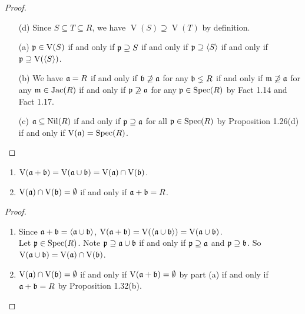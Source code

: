 \begin{proof}
    \begin{enumerate} 
        \item [(d)] Since $S \subseteq T \subseteq R$, we have $\operatorname{V}(S) \supseteq \operatorname{V}(T)$ by definition.
        \item [(a)] $\mathfrak{p} \in \operatorname{V}(S)$ if and only if $\mathfrak{p} \supseteq S$ if and only if $\mathfrak{p} \supseteq \langle S \rangle$ if and only if $\mathfrak{p} \supseteq \operatorname{V}(\langle S \rangle)$.
        \item [(b)]
            We have $\mathfrak{a} = R$ if and only if $\mathfrak{b} \not \supseteq \mathfrak{a}$ for any $\mathfrak{b} \lneq R$ if and only if $\mathfrak{m} \not \supseteq \mathfrak{a}$ for any $\mathfrak{m} \in \operatorname{Jac}(R)$ if and only if $\mathfrak{p} \not \supseteq \mathfrak{a}$ for any $\mathfrak{p} \in \operatorname{Spec}(R)$ by Fact 1.14 and Fact 1.17. 
        \item[(c)] $\mathfrak{a} \subseteq \operatorname{Nil}(R)$ if and only if $\mathfrak{p} \supseteq \mathfrak{a}$ for all $\mathfrak{p} \in \operatorname{Spec}(R)$ by Proposition 1.26(d) if and only if $\operatorname{V}(\mathfrak{a}) = \operatorname{Spec}(R)$. \qedhere
    \end{enumerate}
\end{proof}

\begin{proposition}
    \begin{enumerate}
        \item $\operatorname{V}(\mathfrak{a} + \mathfrak{b}) = \operatorname{V}(\mathfrak{a} \cup \mathfrak{b}) = \operatorname{V}(\mathfrak{a}) \cap \operatorname{V}(\mathfrak{b})$.
        \item $\operatorname{V}(\mathfrak{a}) \cap \operatorname{V}(\mathfrak{b}) = \emptyset$ if and only if $\mathfrak{a} + \mathfrak{b} = R$.
    \end{enumerate}
\end{proposition}

\begin{proof}
    \begin{enumerate}
        \item 
            Since $\mathfrak{a} + \mathfrak{b} = \langle \mathfrak{a} \cup \mathfrak{b} \rangle$, $\operatorname{V}(\mathfrak{a} + \mathfrak{b}) = \operatorname{V}(\langle \mathfrak{a} \cup \mathfrak{b} \rangle) = \operatorname{V}(\mathfrak{a} \cup \mathfrak{b})$. \\
            Let $\mathfrak{p} \in \operatorname{Spec}(R)$. Note $\mathfrak{p} \supseteq \mathfrak{a} \cup \mathfrak{b}$ if and only if $\mathfrak{p} \supseteq \mathfrak{a}$ and $\mathfrak{p} \supseteq \mathfrak{b}$. So $\operatorname{V}(\mathfrak{a} \cup \mathfrak{b}) = \operatorname{V}(\mathfrak{a}) \cap \operatorname{V}(\mathfrak{b})$.
        \item 
            $\operatorname{V}(\mathfrak{a}) \cap \operatorname{V}(\mathfrak{b}) = \emptyset$ if and only if $\operatorname{V}(\mathfrak{a} + \mathfrak{b}) = \emptyset$ by part (a) if and only if $\mathfrak{a} + \mathfrak{b} = R$ by Proposition 1.32(b). \qedhere
    \end{enumerate}
\end{proof}

